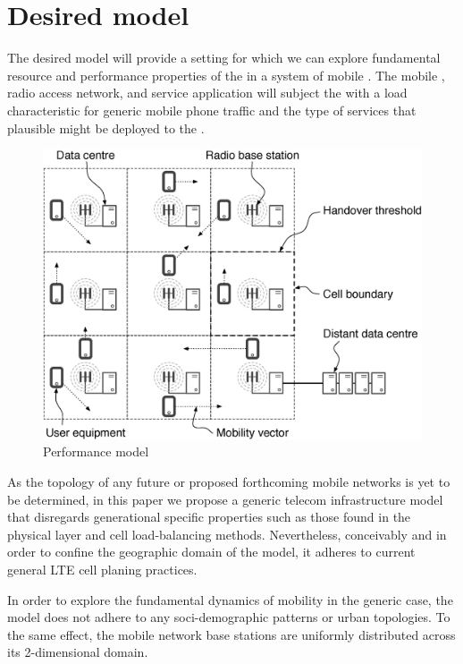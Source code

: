 \section{Desired model}

The desired model will provide a setting for which we can explore fundamental resource and performance properties of the \xcloud{} in a system of mobile \ues{}. The mobile \ues{}, radio access network, and service application will subject the \dcs{} with a load characteristic for generic mobile phone traffic and the type of services that plausible might be deployed to the \xcloud{}.

\begin{figure}[tb]
	\centering
	\includegraphics[width=\linewidth]{desiard_model.eps} 
	\caption{Performance model}
	\label{fig:performance_model}
\end{figure}

As the topology of any future \xcloud{} or proposed forthcoming mobile networks is yet to be determined, in this paper we propose a generic telecom infrastructure model that disregards generational specific properties such as those found in the physical layer and cell load-balancing methods. Nevertheless, conceivably and in order to confine the geographic domain of the model, it adheres to current general LTE cell planing practices. 

In order to explore the fundamental dynamics of mobility in the generic case, the model does not adhere to any soci-demographic patterns or urban topologies. To the same effect, the mobile network base stations are uniformly distributed across its 2-dimensional domain.

